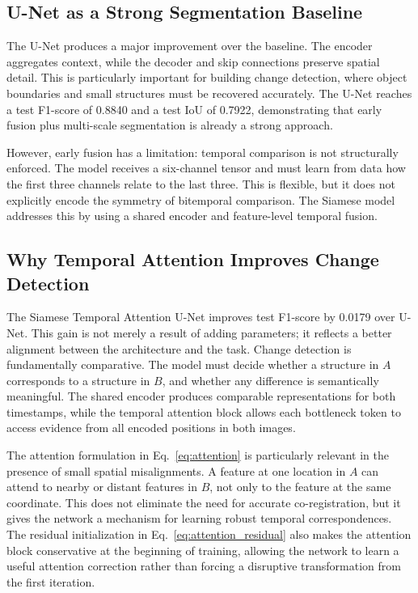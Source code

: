 \documentclass[11pt,a4paper]{article}
\begin{document}
\subsection{U-Net as a Strong Segmentation Baseline}

The U-Net produces a major improvement over the baseline. The encoder aggregates context, while the decoder and skip connections preserve spatial detail. This is particularly important for building change detection, where object boundaries and small structures must be recovered accurately. The U-Net reaches a test F1-score of 0.8840 and a test IoU of 0.7922, demonstrating that early fusion plus multi-scale segmentation is already a strong approach.

However, early fusion has a limitation: temporal comparison is not structurally enforced. The model receives a six-channel tensor and must learn from data how the first three channels relate to the last three. This is flexible, but it does not explicitly encode the symmetry of bitemporal comparison. The Siamese model addresses this by using a shared encoder and feature-level temporal fusion.

\subsection{Why Temporal Attention Improves Change Detection}

The Siamese Temporal Attention U-Net improves test F1-score by 0.0179 over U-Net. This gain is not merely a result of adding parameters; it reflects a better alignment between the architecture and the task. Change detection is fundamentally comparative. The model must decide whether a structure in $A$ corresponds to a structure in $B$, and whether any difference is semantically meaningful. The shared encoder produces comparable representations for both timestamps, while the temporal attention block allows each bottleneck token to access evidence from all encoded positions in both images.

The attention formulation in Eq.~\eqref{eq:attention} is particularly relevant in the presence of small spatial misalignments. A feature at one location in $A$ can attend to nearby or distant features in $B$, not only to the feature at the same coordinate. This does not eliminate the need for accurate co-registration, but it gives the network a mechanism for learning robust temporal correspondences. The residual initialization in Eq.~\eqref{eq:attention_residual} also makes the attention block conservative at the beginning of training, allowing the network to learn a useful attention correction rather than forcing a disruptive transformation from the first iteration.
\end{document}
